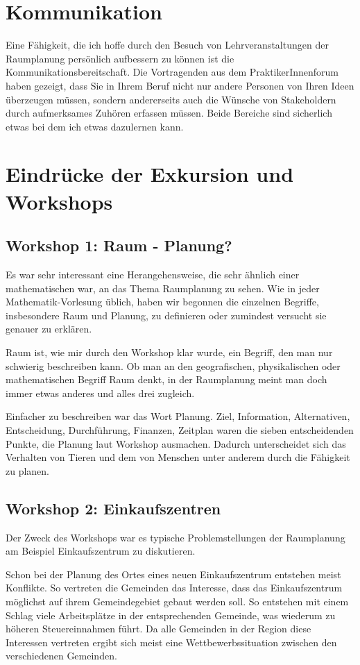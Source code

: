 \documentclass[]{article}
\begin{document}
\section{Kommunikation}
Eine Fähigkeit, die ich hoffe durch den Besuch von Lehrveranstaltungen der Raumplanung persönlich aufbessern zu können ist die Kommunikationsbereitschaft. Die Vortragenden aus dem PraktikerInnenforum haben gezeigt, dass Sie in Ihrem Beruf nicht nur andere Personen von Ihren Ideen überzeugen müssen, sondern andererseits auch die Wünsche von Stakeholdern durch aufmerksames Zuhören erfassen müssen. Beide Bereiche sind sicherlich etwas bei dem ich etwas dazulernen kann.

\section{Eindrücke der Exkursion und Workshops}
\subsection{Workshop 1: Raum - Planung?}
Es war sehr interessant eine Herangehensweise, die sehr ähnlich einer mathematischen war, an das Thema Raumplanung zu sehen. Wie in jeder Mathematik-Vorlesung üblich, haben wir begonnen die einzelnen Begriffe, insbesondere Raum und Planung, zu definieren oder zumindest versucht sie genauer zu erklären.

Raum ist, wie mir durch den Workshop klar wurde, ein Begriff, den man nur schwierig beschreiben kann. Ob man an den geografischen, physikalischen oder mathematischen Begriff Raum denkt, in der Raumplanung meint man doch immer etwas anderes und alles drei zugleich.

Einfacher zu beschreiben war das Wort Planung. Ziel, Information, Alternativen, Entscheidung, Durchführung, Finanzen, Zeitplan waren die sieben entscheidenden Punkte, die Planung laut Workshop ausmachen. Dadurch unterscheidet sich das Verhalten von Tieren und dem von Menschen unter anderem durch die Fähigkeit zu planen.

\subsection{Workshop 2: Einkaufszentren}
Der Zweck des Workshops war es typische Problemstellungen der Raumplanung am Beispiel Einkaufszentrum zu diskutieren.

Schon bei der Planung des Ortes eines neuen Einkaufszentrum entstehen meist Konflikte. So vertreten die Gemeinden das Interesse, dass das Einkaufszentrum möglichst auf ihrem Gemeindegebiet gebaut werden soll. So entstehen mit einem Schlag viele Arbeitsplätze in der entsprechenden Gemeinde, was wiederum zu höheren Steuereinnahmen führt. Da alle Gemeinden in der Region diese Interessen vertreten ergibt sich meist eine Wettbewerbssituation zwischen den verschiedenen Gemeinden.
\end{document}
